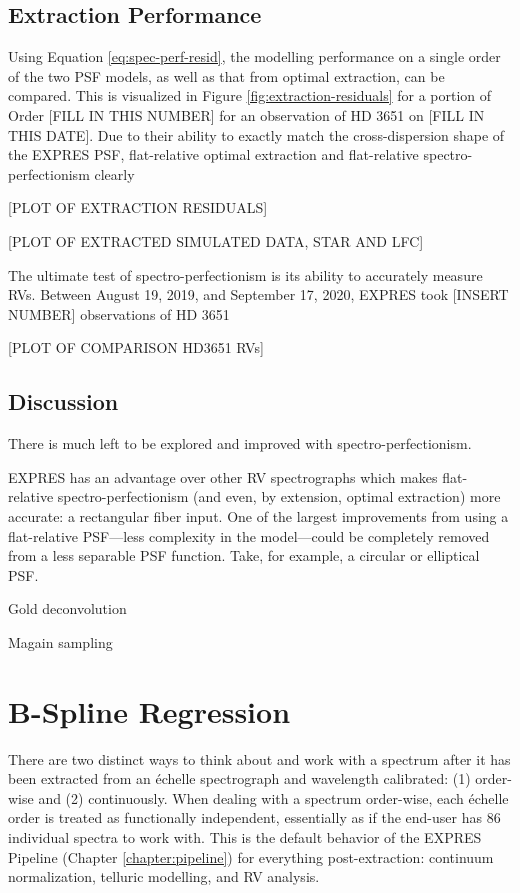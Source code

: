 \subsection{Extraction Performance} \label{pipeline2:spec-perf:performance}

Using Equation \ref{eq:spec-perf-resid}, the modelling performance on a single order of the two PSF models, as well as that from optimal extraction, can be compared. This is visualized in Figure \ref{fig:extraction-residuals} for a portion of Order [FILL IN THIS NUMBER] for an observation of HD 3651 on [FILL IN THIS DATE]. Due to their ability to exactly match the cross-dispersion shape of the EXPRES PSF, flat-relative optimal extraction and flat-relative spectro-perfectionism clearly

[PLOT OF EXTRACTION RESIDUALS]

[PLOT OF EXTRACTED SIMULATED DATA, STAR AND LFC]

The ultimate test of spectro-perfectionism is its ability to accurately measure RVs. Between August 19, 2019, and September 17, 2020, EXPRES took [INSERT NUMBER] observations of HD 3651

[PLOT OF COMPARISON HD3651 RVs]

\subsection{Discussion}

There is much left to be explored and improved with spectro-perfectionism.

EXPRES has an advantage over other RV spectrographs which makes flat-relative spectro-perfectionism (and even, by extension, optimal extraction) more accurate: a rectangular fiber input. One of the largest improvements from using a flat-relative PSF---less complexity in the model---could be completely removed from a less separable PSF function. Take, for example, a circular or elliptical PSF. 

Gold deconvolution

Magain sampling

\section{B-Spline Regression} \label{pipeline2:bspline}

There are two distinct ways to think about and work with a spectrum after it has been extracted from an \'{e}chelle spectrograph and wavelength calibrated: (1) order-wise and (2) continuously. When dealing with a spectrum order-wise, each \'{e}chelle order is treated as functionally independent, essentially as if the end-user has 86 individual spectra to work with. This is the default behavior of the EXPRES Pipeline (Chapter \ref{chapter:pipeline}) for everything post-extraction: continuum normalization, telluric modelling, and RV analysis.

